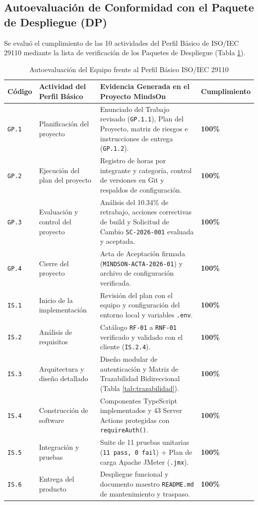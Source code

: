 \documentclass[11pt,a4paper]{article}
\begin{document}
\subsection{Autoevaluación de Conformidad con el Paquete de Despliegue (DP)}
Se evaluó el cumplimiento de las 10 actividades del Perfil Básico de ISO/IEC 29110 mediante la lista de verificación de los Paquetes de Despliegue (Tabla \ref{tab:autoeval}).

\begin{table}[h!]
\centering
\caption{Autoevaluación del Equipo frente al Perfil Básico ISO/IEC 29110}
\label{tab:autoeval}
\renewcommand{\arraystretch}{1.2}
\begin{tabular}{@{}p{1.6cm}p{5.2cm}p{6.5cm}p{2.0cm}@{}}
\toprule
\rowcolor{tableHeader}
\textbf{Código} & \textbf{Actividad del Perfil Básico} & \textbf{Evidencia Generada en el Proyecto MindsOn} & \textbf{Cumplimiento} \\
\midrule
\texttt{GP.1} & Planificación del proyecto & Enunciado del Trabajo revisado (\texttt{GP.1.1}), Plan del Proyecto, matriz de riesgos e instrucciones de entrega (\texttt{GP.1.2}). & \textbf{100\%} \\
\texttt{GP.2} & Ejecución del plan del proyecto & Registro de horas por integrante y categoría, control de versiones en Git y respaldos de configuración. & \textbf{100\%} \\
\texttt{GP.3} & Evaluación y control del proyecto & Análisis del 10.34\% de retrabajo, acciones correctivas de build y Solicitud de Cambio \texttt{SC-2026-001} evaluada y aceptada. & \textbf{100\%} \\
\texttt{GP.4} & Cierre del proyecto & Acta de Aceptación firmada (\texttt{MINDSON-ACTA-2026-01}) y archivo de configuración verificada. & \textbf{100\%} \\
\texttt{IS.1} & Inicio de la implementación & Revisión del plan con el equipo y configuración del entorno local y variables \texttt{.env}. & \textbf{100\%} \\
\texttt{IS.2} & Análisis de requisitos & Catálogo \texttt{RF-01} a \texttt{RNF-01} verificado y validado con el cliente (\texttt{IS.2.4}). & \textbf{100\%} \\
\texttt{IS.3} & Arquitectura y diseño detallado & Diseño modular de autenticación y Matriz de Trazabilidad Bidireccional (Tabla \ref{tab:trazabilidad}). & \textbf{100\%} \\
\texttt{IS.4} & Construcción de software & Componentes TypeScript implementados y 43 Server Actions protegidas con \texttt{requireAuth()}. & \textbf{100\%} \\
\texttt{IS.5} & Integración y pruebas & Suite de 11 pruebas unitarias (\texttt{11 pass, 0 fail}) + Plan de carga Apache JMeter (\texttt{.jmx}). & \textbf{100\%} \\
\texttt{IS.6} & Entrega del producto & Despliegue funcional y documento maestro \texttt{README.md} de mantenimiento y traspaso. & \textbf{100\%} \\
\bottomrule
\end{tabular}
\end{table}
\end{document}
